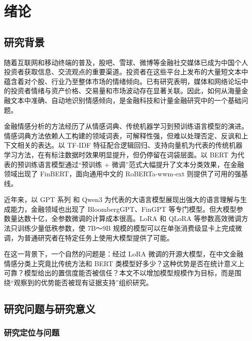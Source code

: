 \clearpage\section{绪论}

\FloatBarrier\subsection{研究背景}

随着互联网和移动终端的普及，股吧、雪球、微博等金融社交媒体已成为中国个人投资者获取信息、交流观点的重要渠道。投资者在这些平台上发布的大量短文本中蕴含着对个股、行业乃至整体市场的情绪倾向。已有研究表明，媒体和网络论坛中的投资者情绪与资产价格、交易量和市场波动存在显著关联\cite{ref1,ref2,ref3,ref4}。因此，如何从海量金融文本中准确、自动地识别情感倾向，是金融科技和计量金融研究中的一个基础问题\cite{ref5}。

金融情感分析的方法经历了从情感词典、传统机器学习到预训练语言模型的演进。情感词典方法依赖人工构建的领域词表\cite{ref6}，可解释性强，但难以处理否定、反讽和上下文相关的表达。以 TF-IDF 特征配合逻辑回归、支持向量机为代表的传统机器学习方法，在有标注数据时效果明显提升，但仍停留在词袋层面。以 BERT\cite{ref7} 为代表的预训练语言模型通过``预训练 + 微调''范式大幅提升了文本分类效果，在金融领域出现了 FinBERT\cite{ref8}，面向通用中文的 RoBERTa-wwm-ext\cite{ref9} 则提供了可用的强基线。

近年来，以 GPT 系列\cite{ref10} 和 Qwen3\cite{ref11} 为代表的大语言模型展现出强大的语言理解与生成能力，金融领域也出现了 BloombergGPT\cite{ref12}、FinGPT\cite{ref13} 等专门模型。但大模型参数量达数十亿，全参数微调的计算成本很高。LoRA\cite{ref14} 和 QLoRA\cite{ref15} 等参数高效微调方法只训练少量低秩参数，使 7B～9B 规模的模型可以在单张消费级显卡上完成微调，为普通研究者在特定任务上使用大模型提供了可能。

在这一背景下，一个自然的问题是：经过 LoRA 微调的开源大模型，在中文金融情感分类上究竟比传统方法和 BERT 类模型好多少？这种优势是否在统计意义上可靠？模型给出的置信度能否被信任？本文不以增加模型规模作为目标，而是围绕``观察到的优势能否被现有证据支持''组织研究。

\FloatBarrier\subsection{研究问题与研究意义}

\subsubsection{研究定位与问题}

